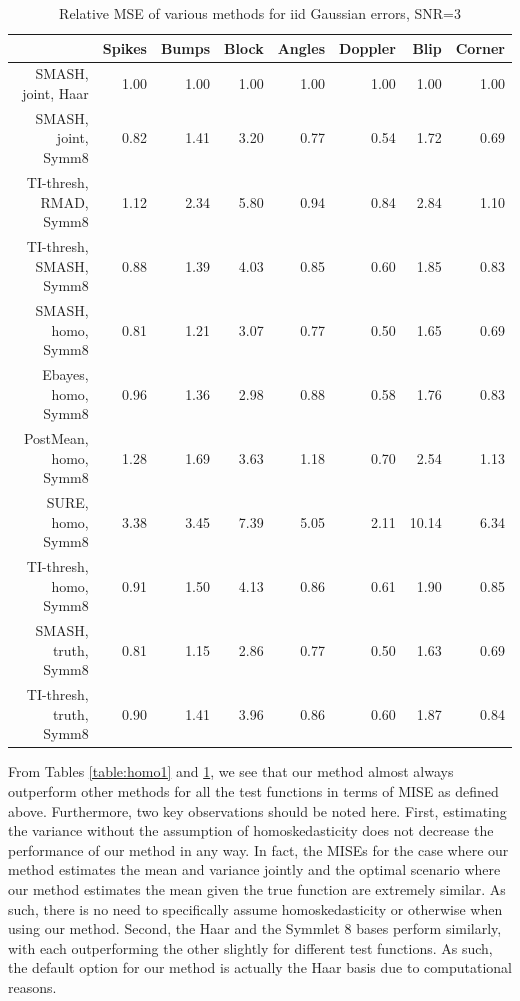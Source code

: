 \documentclass[12pt]{article}
\begin{document}
\begin{table}[ht]
\centering
\begin{tabular}{rrrrrrrr}
  \hline
 & Spikes & Bumps & Block & Angles & Doppler & Blip & Corner \\
  \hline
SMASH, joint, Haar & 1.00 & 1.00 & 1.00 & 1.00 & 1.00 & 1.00 & 1.00 \\
  SMASH, joint, Symm8 & 0.82 & 1.41 & 3.20 & 0.77 & 0.54 & 1.72 & 0.69 \\
  TI-thresh, RMAD, Symm8 & 1.12 & 2.34 & 5.80 & 0.94 & 0.84 & 2.84 & 1.10 \\
  TI-thresh, SMASH, Symm8 & 0.88 & 1.39 & 4.03 & 0.85 & 0.60 & 1.85 & 0.83 \\
  SMASH, homo, Symm8 & 0.81 & 1.21 & 3.07 & 0.77 & 0.50 & 1.65 & 0.69 \\
  Ebayes, homo, Symm8 & 0.96 & 1.36 & 2.98 & 0.88 & 0.58 & 1.76 & 0.83 \\
  PostMean, homo, Symm8 & 1.28 & 1.69 & 3.63 & 1.18 & 0.70 & 2.54 & 1.13 \\
  SURE, homo, Symm8 & 3.38 & 3.45 & 7.39 & 5.05 & 2.11 & 10.14 & 6.34 \\
  TI-thresh, homo, Symm8 & 0.91 & 1.50 & 4.13 & 0.86 & 0.61 & 1.90 & 0.85 \\
  SMASH, truth, Symm8 & 0.81 & 1.15 & 2.86 & 0.77 & 0.50 & 1.63 & 0.69 \\
  TI-thresh, truth, Symm8 & 0.90 & 1.41 & 3.96 & 0.86 & 0.60 & 1.87 & 0.84 \\
   \hline
\end{tabular}
\caption{Relative MSE of various methods for iid Gaussian errors, SNR=3}
\label{table:homo3}
\end{table}
From Tables \ref{table:homo1} and \ref{table:homo3}, we see that our method almost always outperform other methods for all the test functions in terms of MISE as defined above. Furthermore, two key observations should be noted here. First, estimating the variance without the assumption of homoskedasticity does not decrease the performance of our method in any way. In fact, the MISEs for the case where our method estimates the mean and variance jointly and the optimal scenario where our method estimates the mean given the true function are extremely similar. As such, there is no need to specifically assume homoskedasticity or otherwise when using our method. Second, the Haar and the Symmlet 8 bases perform similarly, with each outperforming the other slightly for different test functions. As such, the default option for our method is actually the Haar basis due to computational reasons. \bigskip\\
\end{document}
